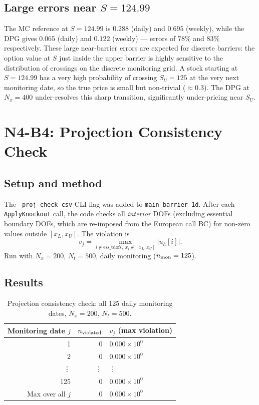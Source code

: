\documentclass[11pt,a4paper]{article}
\newcommand{\Nx}{N_x}
\newcommand{\Nt}{N_t}
\newcommand{\SU}{S_U}
\begin{document}
\subsection{Large errors near $S = 124.99$}

The MC reference at $S = 124.99$ is $0.288$ (daily) and $0.695$
(weekly), while the DPG gives $0.065$ (daily) and $0.122$ (weekly) ---
errors of $78\%$ and $83\%$ respectively.  These large near-barrier
errors are expected for discrete barriers: the option value at $S$
just inside the upper barrier is highly sensitive to the distribution
of crossings on the discrete monitoring grid.  A stock starting at
$S = 124.99$ has a very high probability of crossing $\SU = 125$ at
the very next monitoring date, so the true price is small but non-trivial
($\approx 0.3$).  The DPG at $\Nx = 400$ under-resolves this sharp
transition, significantly under-pricing near $\SU$.

\section{N4-B4: Projection Consistency Check}
\label{sec:projcheck}

\subsection{Setup and method}

The \texttt{--proj-check-csv} CLI flag was added to
\texttt{main\_barrier\_1d}.  After each \texttt{ApplyKnockout} call,
the code checks all \emph{interior} DOFs (excluding essential boundary
DOFs, which are re-imposed from the European call BC) for non-zero
values outside $[x_L, x_U]$.  The violation is
\[
  v_j = \max_{i \notin \text{ess\_tdofs},\; x_i \notin [x_L, x_U]}
        |u_h[i]|.
\]
Run with $\Nx = 200$, $\Nt = 500$, daily monitoring ($n_{\rm mon} = 125$).

\subsection{Results}

\begin{table}[htbp]
\centering
\caption{Projection consistency check: all 125 daily monitoring dates,
         $\Nx=200$, $\Nt=500$.}
\label{tab:projcheck}
\begin{tabular}{rrl}
\toprule
Monitoring date $j$ & $n_{\rm violated}$ & $v_j$ (max violation) \\
\midrule
1 & 0 & $0.000\times10^{0}$ \\
2 & 0 & $0.000\times10^{0}$ \\
\vdots & \vdots & \vdots \\
125 & 0 & $0.000\times10^{0}$ \\
\midrule
Max over all $j$ & 0 & $0.000\times10^{0}$ \\
\bottomrule
\end{tabular}
\end{table}
\end{document}
